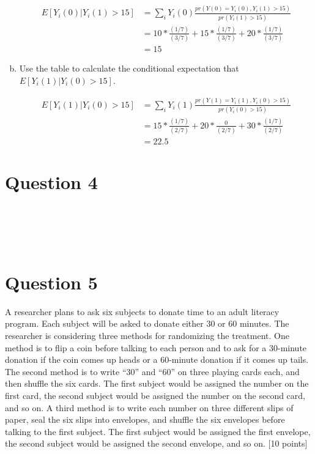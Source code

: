 \documentclass[11pt,notitlepage]{article}\usepackage[]{graphicx}\usepackage[]{color}
\makeatletter
\newenvironment{kframe}{%
 \def\at@end@of@kframe{}%
 \ifinner\ifhmode%
  \def\at@end@of@kframe{\end{minipage}}%
  \begin{minipage}{\columnwidth}%
 \fi\fi%
 \def\FrameCommand##1{\hskip\@totalleftmargin \hskip-\fboxsep
 \colorbox{shadecolor}{##1}\hskip-\fboxsep
     \hskip-\linewidth \hskip-\@totalleftmargin \hskip\columnwidth}%
 \MakeFramed {\advance\hsize-\width
   \@totalleftmargin\z@ \linewidth\hsize
   \@setminipage}}%
 {\par\unskip\endMakeFramed%
 \at@end@of@kframe}
\newenvironment{knitrout}{}{} %
\makeatother
\begin{document}
\begin{enumerate}[a)]
\begin{align*}
E[Y_i (0)| Y_i (1)>15] & =\sum_i Y_i(0) \frac{pr(Y(0)=Y_i (0),Y_i (1)>15)}{pr(Y_i (1)>15)} \\
&=10*\frac{(1/7)}{(3/7)} +15* \frac{(1/7)}{(3/7)}+20*\frac{(1/7)}{(3/7)}\\
&=15
\end{align*}

\item Use the table to calculate the conditional expectation that $E[Y_{i}(1)|Y_{i}(0) > 15]$.  

\begin{align*}
E[Y_i (1)| Y_i (0)>15] & =\sum_i Y_i(1) \frac{pr(Y(1)=Y_i (1),Y_i (0)>15)}{pr(Y_i (0)>15)} \\
&=15*\frac{(1/7)}{(2/7)} +20* \frac{0}{(2/7)}+30*\frac{(1/7)}{(2/7)}\\
&=22.5
\end{align*}


\end{enumerate}  


\section*{Question 4}
\begin{knitrout}
\color{fgcolor}\begin{kframe}
\begin{verbatim}





\end{verbatim}
\end{kframe}
\end{knitrout}

\section*{Question 5}
A researcher plans to ask six subjects to donate time to an adult literacy program. Each subject will be asked to donate either 30 or 60 minutes.  The researcher is considering three methods for randomizing the treatment.  One method is to flip a coin before talking to each person and to ask for a 30-minute donation if the coin comes up heads or a 60-minute donation if it comes up tails. The second method is to write ``30'' and ``60'' on three playing cards each, and then shuffle the six cards. The first subject would be assigned the number on the first card, the second subject would be assigned the number on the second card, and so on.  A third method is to write each number on three different slips of paper, seal the six slips into envelopes, and shuffle the six envelopes before talking to the first subject.  The first subject would be assigned the first envelope, the second subject would be assigned the second envelope, and so on. [10 points]
\end{document}
